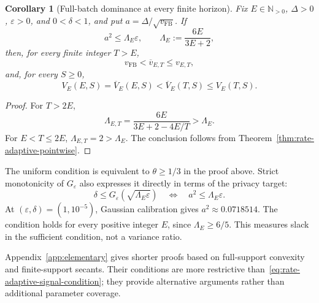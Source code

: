 \documentclass[11pt]{article}
\newtheorem{corollary}[theorem]{Corollary}
\theoremstyle{remark}
\newcommand{\N}{\mathbb N}
\begin{document}
\begin{corollary}[Full-batch dominance at every finite horizon]
\label{cor:fixed-epoch-all-horizon}
Fix $E\in\N_{>0}$, $\Delta>0$, $\varepsilon>0$, and $0<\delta<1$, and put
$a=\Delta/\sqrt{v_{\mathrm{FB}}}$. If
\begin{equation}\label{eq:epoch-uniform-condition}
 a^2\leq\Lambda_E\varepsilon,
 \qquad \Lambda_E:=\frac{6E}{3E+2},
\end{equation}
then, for every finite integer $T>E$,
\[
 v_{\mathrm{FB}}<\overline v_{E,T}\leq v_{E,T},
\]
and, for every $S\geq0$,
\[
 V_E(E,S)=\overline V_E(E,S)<\overline V_E(T,S)\leq V_E(T,S).
\]
\end{corollary}

\begin{proof}
For $T>2E$,
\[
 \Lambda_{E,T}=\frac{6E}{3E+2-4E/T}>\Lambda_E.
\]
For $E<T\leq2E$, $\Lambda_{E,T}=2>\Lambda_E$. The conclusion follows from
Theorem~\ref{thm:rate-adaptive-pointwise}.
\end{proof}

The uniform condition is equivalent to $\theta\geq1/3$ in the proof above.
Strict monotonicity of $G_\varepsilon$ also expresses it directly in terms
of the privacy target:
\begin{equation}\label{eq:epoch-uniform-delta-threshold}
 \delta\leq G_\varepsilon(\sqrt{\Lambda_E\varepsilon})
 \quad\Longleftrightarrow\quad a^2\leq\Lambda_E\varepsilon.
\end{equation}
At $(\varepsilon,\delta)=(1,10^{-5})$, Gaussian calibration gives
$a^2\approx0.0718514$. The condition holds for every positive integer $E$,
since $\Lambda_E\geq6/5$. This measures slack in the sufficient condition,
not a variance ratio.

Appendix~\ref{app:elementary} gives shorter proofs based on full-support
convexity and finite-support secants. Their conditions are more restrictive
than~\eqref{eq:rate-adaptive-signal-condition}; they provide alternative
arguments rather than additional parameter coverage.
\end{document}
